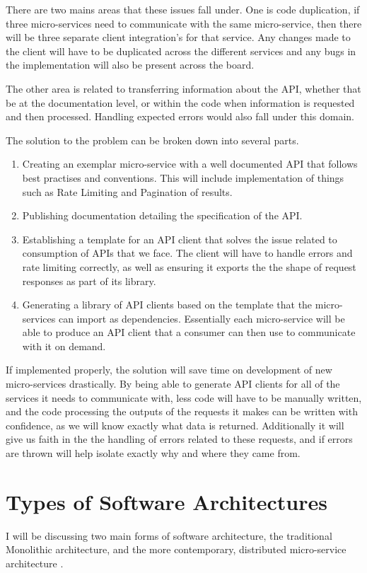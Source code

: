 There are two mains areas that these issues fall under. One is code duplication, if three micro-services need to communicate with the same micro-service, then there will  be three separate client integration's for that service. Any changes made to the client will have to be duplicated across the different services and any bugs in the implementation will also be present across the board. 

The other area is related to transferring information about the API, whether that be at the documentation level, or within the code when information is requested and then processed. Handling expected errors would also fall under this domain.

The solution to the problem can be broken down into several parts.
 \begin{enumerate}
   \item Creating an exemplar micro-service with a well documented API that follows best practises and conventions. This will include implementation of things such as Rate Limiting and Pagination of results.
   \item Publishing documentation detailing the specification of the API.
   \item Establishing a template for an API client that solves the issue related to consumption of APIs that we face. The client will have to handle errors and rate limiting correctly, as well as ensuring it exports the the shape of request responses as part of its library.
   \item Generating a library of API clients based on the template that the micro-services can import as dependencies. Essentially each micro-service will be able to produce an API client that a consumer can then use to communicate with it on demand.
 \end{enumerate}
 
 If implemented properly, the solution will save time on development of new micro-services drastically. By being able to generate API clients for all of the services it needs to communicate with, less code will have to be manually written, and the code processing the outputs of the requests it makes can be written with confidence, as we will know exactly what data is returned. Additionally it will give us faith in the the handling of errors related to these requests, and if errors are thrown will help isolate exactly why and where they came from. 
 
\section{Types of Software Architectures}
I will be discussing two main forms of software architecture, the traditional Monolithic architecture, and the more contemporary, distributed micro-service architecture .
